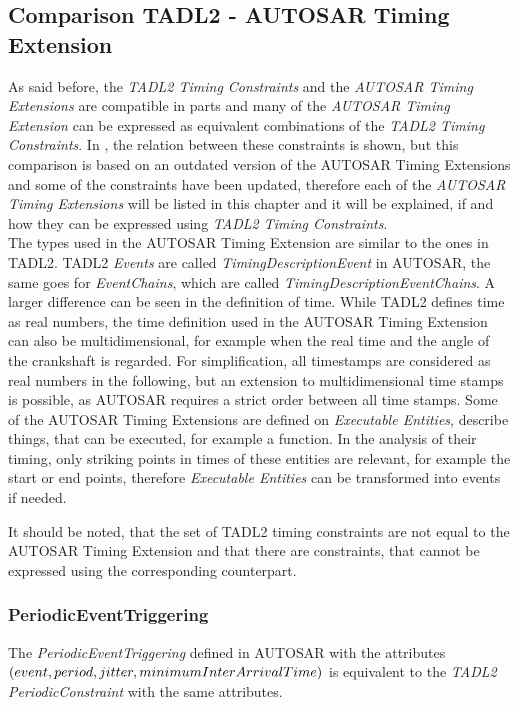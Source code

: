 \subsection{Comparison TADL2 - AUTOSAR Timing Extension}
\label{comparisonConstraints}
	As said before, the \emph{TADL2 Timing Constraints} and the \emph{AUTOSAR Timing Extensions} are compatible in parts and many of the \emph{AUTOSAR Timing Extension} can be expressed as equivalent combinations of the \emph{TADL2 Timing Constraints}. In \cite{TIMMO2USE}, the relation between these constraints is shown, but this comparison is based on an outdated version of the AUTOSAR Timing Extensions and some of the constraints have been updated, therefore each of the \emph{AUTOSAR Timing Extensions} will be listed in this chapter and it will be explained, if and how they can be expressed using \emph{TADL2 Timing Constraints}.\\
	The types used in the AUTOSAR Timing Extension are similar to the ones in TADL2. TADL2 \emph{Events} are called \emph{TimingDescriptionEvent} in AUTOSAR, the same goes for \emph{EventChains}, which are called \emph{TimingDescriptionEventChains}. A larger difference can be seen in the definition of time. While TADL2 defines time as real numbers, the time definition used in the AUTOSAR Timing Extension can also be multidimensional, for example when the real time and the angle of the crankshaft is regarded. For simplification, all timestamps are considered as real numbers in the following, but an extension to multidimensional time stamps is possible, as AUTOSAR requires a strict order between all time stamps. Some of the AUTOSAR Timing Extensions are defined on \emph{Executable Entities}, describe things, that can be executed, for example a function. In the analysis of their timing, only striking points in times of these entities are relevant, for example the start or end points, therefore \emph{Executable Entities} can be transformed into events if needed.
	
	It should be noted, that the set of TADL2 timing constraints are not equal to the AUTOSAR Timing Extension and that there are constraints, that cannot be expressed using the corresponding counterpart.

	\subsubsection{PeriodicEventTriggering}
		The \emph{PeriodicEventTriggering} defined in AUTOSAR with the attributes\\ $(\textcolor{black}{event}, period, jitter, minimumInterArrivalTime)$ is equivalent to the \emph{TADL2} \emph{PeriodicConstraint} with the same attributes.
		

